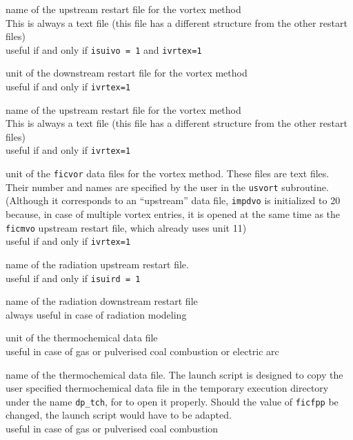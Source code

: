 {name of the upstream restart file for the vortex method\\
This is always a text file (this file has a different structure from the
other restart files)\\
useful if and only if {\tt isuivo = 1} and {\tt ivrtex=1}}

{unit of the downstream restart file for the vortex method\\
useful if and only if {\tt ivrtex=1}}

{name of the upstream restart file for the vortex method\\
This is always a text file (this file has a different structure from the
other restart files)\\
useful if and only if {\tt ivrtex=1}}

{unit of the {\tt ficvor} data files for the vortex method. These
files are text files. Their number and names are specified by the user in
the \texttt{usvort} subroutine.\\
(Although it corresponds to an ``upstream'' data file, {\tt impdvo} is
initialized to 20 because, in case of multiple vortex entries,
it is opened at the same time as the {\tt ficmvo} upstream restart file,
which already uses unit 11)\\
useful if and only if {\tt ivrtex=1}}



{name of the radiation upstream restart file.\\
useful if and only if {\tt isuird = 1}}

{name of the radiation downstream restart file \\
always useful in case of radiation modeling}



{unit of the thermochemical data file\\
useful in case of gas or pulverised coal combustion or electric arc}

{name of the thermochemical data file. The launch script is designed to copy the
user specified thermochemical data file in the temporary execution directory
under the name \texttt{dp\_tch}, for \CS to open it properly. Should the value
of {\tt ficfpp} be changed, the launch script would have to be adapted.\\
useful in case of gas or pulverised coal combustion}

